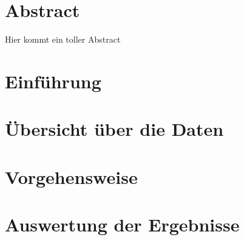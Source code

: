 \documentclass[
	a4paper, %
	12pt, %
	twoside, %
	BCOR=5mm, %
	fleqn, %
	bibliography=totoc, %
	headinclude, %
	headsepline
]{scrreprt}
\begin{document}
	\renewcommand{\arraystretch}{1.15} %



	

	\pagestyle{headings}

	\chapter*{Abstract}
	Hier kommt ein toller Abstract

	\tableofcontents

	\setlength{\parskip}{.2em} %

	\chapter{Einführung}
	
	
	\chapter{Übersicht über die Daten}
	
	
	\chapter{Vorgehensweise}
	
	\chapter{Auswertung der Ergebnisse}
	

	\newpage
	

	
\end{document}
